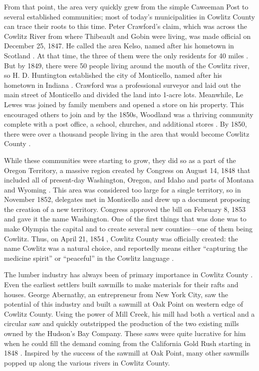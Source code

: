 From that point, the area very quickly grew from the simple Caweeman Post to several established communities; most of today's municipalities in Cowlitz County can trace their roots to this time. Peter Crawford's claim, which was across the Cowlitz River from where Thibeault and Gobin were living, was made official on December 25, 1847. He called the area Kelso, named after his hometown in Scotland \citep[51]{olson_1948}. At that time, the three of them were the only residents for 40 miles \citep[39]{urrutia_1998}. But by 1849, there were 50 people living around the mouth of the Cowlitz river, so H. D. Huntington established the city of Monticello, named after his hometown in Indiana \citep[12]{olson_1948}. Crawford was a professional surveyor and laid out the main street of Monticello and divided the land into 1-acre lots. Meanwhile, Le Lewes was joined by family members and opened a store on his property. This encouraged others to join and by the 1850s, Woodland was a thriving community complete with a post office, a school, churches, and additional stores \citep[43-45]{urrutia_1998}. By 1850, there were over a thousand people living in the area that would become Cowlitz County \citep[68]{urrutia_1998}.

While these communities were starting to grow, they did so as a part of the Oregon Territory, a massive region created by Congress on August 14, 1848 that included all of present-day Washington, Oregon, and Idaho and parts of Montana and Wyoming \citep[10-11]{olson_1948}. This area was considered too large for a single territory, so in November 1852, delegates met in Monticello and drew up a document proposing the creation of a new territory. Congress approved the bill on February 8, 1853 and gave it the name Washington. One of the first things that was done was to make Olympia the capital and to create several new counties—one of them being Cowlitz. Thus, on April 21, 1854 , Cowlitz County was officially created: the name Cowlitz was a natural choice, and reportedly means either “capturing the medicine spirit” or “peaceful” in the Cowlitz language \citep[11]{olson_1948}.

The lumber industry has always been of primary importance in Cowlitz County \citep[85-88]{urrutia_1998}. Even the earliest settlers built sawmills to make materials for their rafts and houses. George Abernathy, an entrepreneur from New York City, saw the potential of this industry and built a sawmill at Oak Point on western edge of Cowlitz County. Using the power of Mill Creek, his mill had both a vertical and a circular saw and quickly outstripped the production of the two existing mills owned by the Hudson's Bay Company. These saws were quite lucrative for him when he could fill the demand coming from the California Gold Rush starting in 1848 \citep[18-19]{olson_1948}. Inspired by the success of the sawmill at Oak Point, many other sawmills popped up along the various rivers in Cowlitz County.

